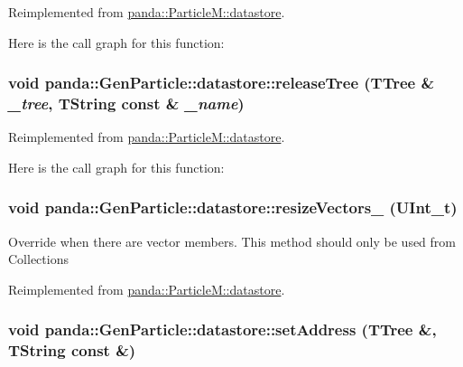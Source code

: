Reimplemented from \hyperlink{structpanda_1_1ParticleM_1_1datastore_a4069b8cdca5715ed6faf0a7907ea8386}{panda::ParticleM::datastore}.

Here is the call graph for this function:\hypertarget{structpanda_1_1GenParticle_1_1datastore_a7c4f6ca82174720a87fa2371f40000d7}{
\subsubsection[{releaseTree}]{\setlength{\rightskip}{0pt plus 5cm}void panda::GenParticle::datastore::releaseTree (TTree \& {\em \_\-tree}, \/  TString const \& {\em \_\-name})}}
\label{structpanda_1_1GenParticle_1_1datastore_a7c4f6ca82174720a87fa2371f40000d7}


Reimplemented from \hyperlink{structpanda_1_1ParticleM_1_1datastore_ad6986990fa55f1c6ca4e92db28486922}{panda::ParticleM::datastore}.

Here is the call graph for this function:\hypertarget{structpanda_1_1GenParticle_1_1datastore_a28a604490b71305ae71b9671e3ea0bdf}{
\subsubsection[{resizeVectors\_\-}]{\setlength{\rightskip}{0pt plus 5cm}void panda::GenParticle::datastore::resizeVectors\_\- (UInt\_\-t)}}
\label{structpanda_1_1GenParticle_1_1datastore_a28a604490b71305ae71b9671e3ea0bdf}


Override when there are vector members. This method should only be used from Collections 

Reimplemented from \hyperlink{structpanda_1_1ParticleM_1_1datastore_a6dd61d4a8f70e81a1638757a5edbc7ed}{panda::ParticleM::datastore}.\hypertarget{structpanda_1_1GenParticle_1_1datastore_ae55290c7499a0b5c80309462637d9e73}{
\subsubsection[{setAddress}]{\setlength{\rightskip}{0pt plus 5cm}void panda::GenParticle::datastore::setAddress (TTree \&, \/  TString const \&)}}
\label{structpanda_1_1GenParticle_1_1datastore_ae55290c7499a0b5c80309462637d9e73}


